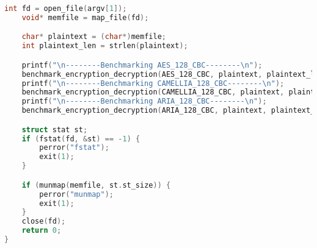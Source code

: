\documentclass{article}
\begin{document}
\begin{lstlisting}[language=C]
    int fd = open_file(argv[1]);
    void* memfile = map_file(fd);

    char* plaintext = (char*)memfile;
    int plaintext_len = strlen(plaintext);

    printf("\n--------Benchmarking AES_128_CBC--------\n");
    benchmark_encryption_decryption(AES_128_CBC, plaintext, plaintext_len, KEY, IV);
    printf("\n--------Benchmarking CAMELLIA_128_CBC--------\n");
    benchmark_encryption_decryption(CAMELLIA_128_CBC, plaintext, plaintext_len, KEY, IV);
    printf("\n--------Benchmarking ARIA_128_CBC--------\n");
    benchmark_encryption_decryption(ARIA_128_CBC, plaintext, plaintext_len, KEY, IV);

    struct stat st;
    if (fstat(fd, &st) == -1) {
        perror("fstat");
        exit(1);
    }

    if (munmap(memfile, st.st_size)) {
        perror("munmap");
        exit(1);
    }
    close(fd);
    return 0;
}
\end{lstlisting}
\end{document}
